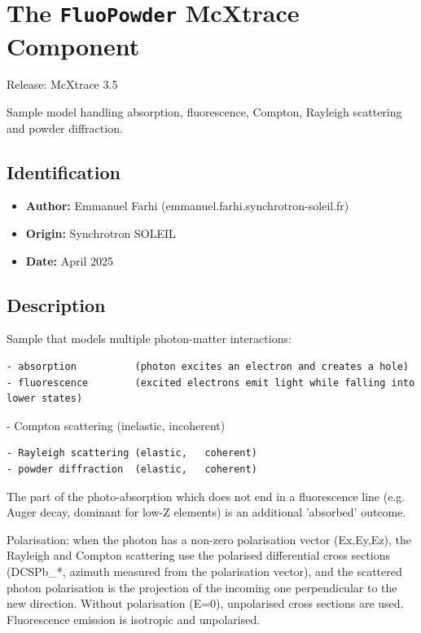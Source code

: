 \section{The \texttt{FluoPowder} McXtrace Component}
Release:    McXtrace 3.5

Sample model handling absorption, fluorescence, Compton, Rayleigh scattering and powder diffraction.

\subsection*{Identification}
\begin{itemize}
  \item \textbf{Author:} Emmanuel Farhi (emmanuel.farhi.synchrotron-soleil.fr)
  \item \textbf{Origin:} Synchrotron SOLEIL
  \item \textbf{Date:} April 2025
\end{itemize}

\subsection*{Description}
Sample that models multiple photon-matter interactions:

\begin{verbatim}
- absorption          (photon excites an electron and creates a hole)
- fluorescence        (excited electrons emit light while falling into lower states)
\end{verbatim}

- Compton scattering (inelastic, incoherent)

\begin{verbatim}
- Rayleigh scattering (elastic,   coherent)
- powder diffraction  (elastic,   coherent)
\end{verbatim}

The part of the photo-absorption which does not end in a fluorescence line (e.g. Auger decay, dominant for low-Z elements) is an additional 'absorbed' outcome.

Polarisation: when the photon has a non-zero polarisation vector (Ex,Ey,Ez), the Rayleigh and Compton scattering use the polarised differential cross sections (DCSPb\_*, azimuth measured from the polarisation vector), and the scattered photon polarisation is the projection of the incoming one perpendicular to the new direction. Without polarisation (E=0), unpolarised cross sections are used. Fluorescence emission is isotropic and unpolarised.

